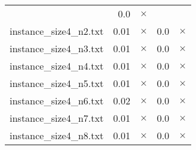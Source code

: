 \documentclass{article}
\begin{document}
\begin{center}
\begin{tabular}{lrrrr}
 & 0.0 & 
$\times$
\\
instance\_size4\_n2.txt & 0.01 & 
$\times$
 & 0.0 & 
$\times$
\\
instance\_size4\_n3.txt & 0.01 & 
$\times$
 & 0.0 & 
$\times$
\\
instance\_size4\_n4.txt & 0.01 & 
$\times$
 & 0.0 & 
$\times$
\\
instance\_size4\_n5.txt & 0.01 & 
$\times$
 & 0.0 & 
$\times$
\\
instance\_size4\_n6.txt & 0.02 & 
$\times$
 & 0.0 & 
$\times$
\\
instance\_size4\_n7.txt & 0.01 & 
$\times$
 & 0.0 & 
$\times$
\\
instance\_size4\_n8.txt & 0.01 & 
$\times$
 & 0.0 & 
$\times$
\\
\hline\end{tabular}
\end{center}
\end{document}
